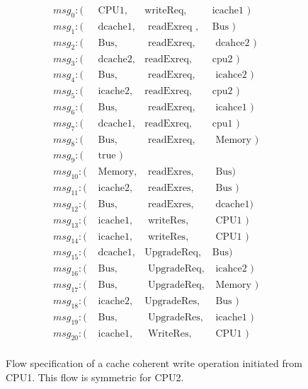\documentclass[conference]{IEEEtran}
\begin{document}
\begin{figure}
 {\footnotesize
 \[
 \begin{array}{llll}
 msg_0: (&\mbox{ CPU1},&\mbox{writeReq},&\mbox{icache1   })\\       
 msg_1: (&\mbox{ dcache1},&\mbox{ readExreq },&\mbox{Bus     })\\        
 msg_2: (&\mbox{ Bus},&\mbox{ readExreq},&\mbox{ dcahce2 })\\  
 msg_3: (&\mbox{ dcache2},&\mbox{readExreq},&\mbox{cpu2         })\\   
 msg_4: (&\mbox{ Bus},&\mbox{ readExreq},&\mbox{ icahce2           })\\  
 msg_5: (&\mbox{ icache2},&\mbox{readExreq},&\mbox{cpu2 })\\  
 msg_6: (&\mbox{ Bus},&\mbox{ readExreq},&\mbox{ icahce1       })\\     
 msg_7: (&\mbox{ dcache1},&\mbox{readExreq},&\mbox{cpu1           })\\  
 msg_8: (&\mbox{ Bus},&\mbox{ readExreq},&\mbox{ Memory })\\  
 msg_9: (&\mbox{ true                                          })\\  
 msg_{10}: (&\mbox{ Memory},&\mbox{ readExres},&\mbox{ Bus})\\  
 msg_{11}: (&\mbox{ icache2},&\mbox{ readExres},&\mbox{ Bus })\\  
 msg_{12}: (&\mbox{ Bus},&\mbox{ readExres},&\mbox{ dcache1})\\  
 msg_{13}: (&\mbox{ icache1},&\mbox{ writeRes},&\mbox{ CPU1         })\\  
 msg_{14}: (&\mbox{ icache1},&\mbox{ writeRes},&\mbox{ CPU1 })\\  
 msg_{15}: (&\mbox{ dcache1},&\mbox{UpgradeReq},&\mbox{Bus})\\  
 msg_{16}: (&\mbox{ Bus},&\mbox{ UpgradeReq},&\mbox{ icahce2      })\\   
 msg_{17}: (&\mbox{ Bus},&\mbox{ UpgradeReq},&\mbox{ Memory })\\  
 msg_{18}: (&\mbox{ icache2},&\mbox{UpgradeRes},&\mbox{ Bus     })\\  
 msg_{19}: (&\mbox{ Bus},&\mbox{ UpgradeRes},&\mbox{ icache1      })\\  
 msg_{20}: (&\mbox{ icache1},&\mbox{ WriteRes},&\mbox{ CPU1 })\\  
 \end{array}
 \]}
 \caption{Flow specification of a cache coherent write operation initiated from CPU1. This flow is symmetric for CPU2. }
 \label{write-flow}
 \end{figure}
\end{document}
